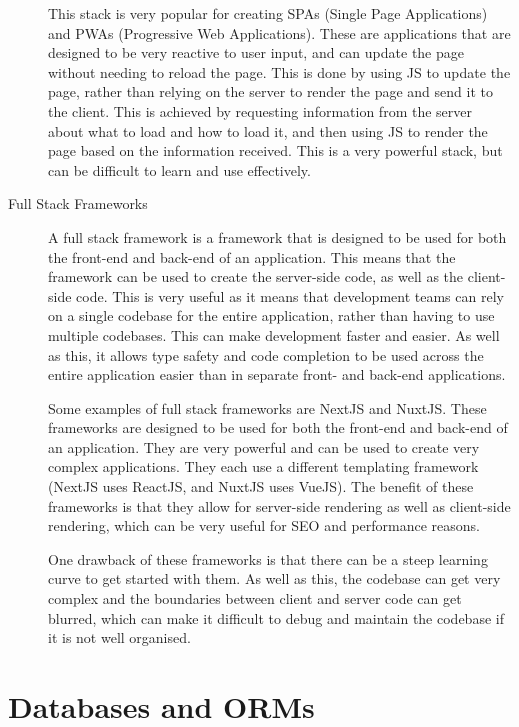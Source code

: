 \documentclass[12pt, a4paper,twoside]{report}
\theoremstyle{plain} %
\theoremstyle{definition} %
\numberwithin{equation}{chapter}
\begin{document}
\begin{description}
{        This stack is very popular for creating SPAs (Single Page Applications) and
        PWAs (Progressive Web Applications). These are applications that are designed
        to be very reactive to user input, and can update the page without needing to
        reload the page. This is done by using JS to update the page, rather than
        relying on the server to render the page and send it to the client. This is
        achieved by requesting information from the server about what to load and how
        to load it, and then using JS to render the page based on the information
        received. This is a very powerful stack, but can be difficult to learn and
        use effectively.
        }
    \item[Full Stack Frameworks] {
        A full stack framework is a framework that is designed to be used for both
        the front-end and back-end of an application. This means that the framework
        can be used to create the server-side code, as well as the client-side code.
        This is very useful as it means that development teams can rely on a single
        codebase for the entire application, rather than having to use multiple
        codebases. This can make development faster and easier. As well as this, it
        allows type safety and code completion to be used across the entire application
        easier than in separate front- and back-end applications.

        Some examples of full stack frameworks are NextJS and NuxtJS\@. These
        frameworks are designed to be used for both the front-end and back-end of
        an application. They are very powerful and can be used to create very complex
        applications. They each use a different templating framework (NextJS uses
        ReactJS, and NuxtJS uses VueJS). The benefit of these frameworks is that they
        allow for server-side rendering as well as client-side rendering, which can
        be very useful for SEO and performance reasons.

        One drawback of these frameworks is that there can be a steep learning curve
        to get started with them. As well as this, the codebase can get very complex
        and the boundaries between client and server code can get blurred, which can
        make it difficult to debug and maintain the codebase if it is not well organised.
        }
\end{description}

\section{Databases and ORMs}\label{sec:databasesorms}
\end{document}
